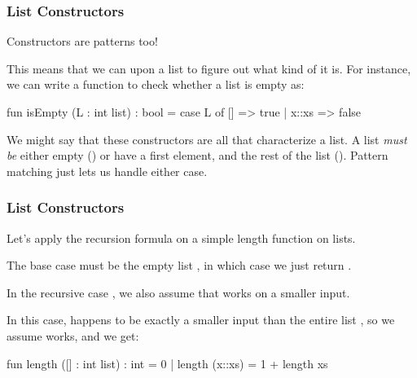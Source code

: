 \documentclass[aspectratio=169]{beamer}
\begin{document}
\begin{frame}[fragile]
  \frametitle{List Constructors}

  Constructors are patterns too! 

  \pause
  \vspace{\fill}

  This means that we can  upon a list to figure out what kind of 
   it is. For instance, we can write a function to check whether
  a list is empty as:
  
  \pause

  \begin{codeblock}
    fun isEmpty (L : int list) : bool = 
      case L of
        [] => true
      | x::xs => false
  \end{codeblock}

  \pause
  \vspace{\fill}

  We might say that these constructors are all that characterize a list. A list 
  \textit{must be} either empty (\code{[]}) or have a first element, and the rest of 
  the list (). Pattern matching just lets us handle either case.
\end{frame}

\begin{frame}[fragile]
  \frametitle{List Constructors}

  Let's apply the recursion formula on a simple length function on lists.

  \pause
  \vspace{\fill}

  The base case must be the empty list \code{[]}, in which case we just return . 

  \pause
  \vspace{10pt}

  In the recursive case , we also assume that  works on a smaller
  input. 

  \pause
  \vspace{5pt}
  
  In this case,  happens to be exactly a smaller input than the entire 
  list , so we assume  works, and we get: 

  \pause
  \vspace{\fill}

  \begin{codeblock}
    fun length ([] : int list) : int = 0 
      | length (x::xs) = 1 + length xs
  \end{codeblock}
\end{frame}
\end{document}
